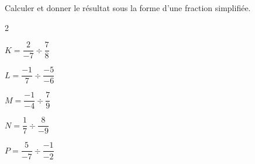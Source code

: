 \begin{exercice*}
    Calculer et donner le résultat sous la forme d'une fraction simplifiée.
    \begin{multicols}2
        \begin{list}{}{}
            \begin{spacing}{2}
                \item $K=\dfrac{2}{-7}\div\dfrac{7}{8}$
                \item $L=\dfrac{-1}{7}\div\dfrac{-5}{-6}$
                \item $M=\dfrac{-1}{-4}\div\dfrac{7}{9}$
                \item $N=\dfrac{1}{7}\div\dfrac{8}{-9}$
                \item $P=\dfrac{5}{-7}\div\dfrac{-1}{-2}$
            \end{spacing}
        \end{list}
    \end{multicols}


\end{exercice*}
